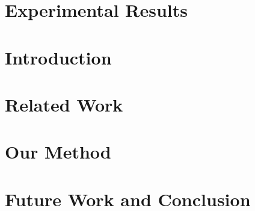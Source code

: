 \section{Experimental Results}
\label{sec:results}


\section{Introduction}
\label{sec:introduction}


\section{Related Work}
\label{sec:related}



\section{Our Method}
\label{sec:method}


\section{Future Work and Conclusion}
\label{sec:conclusion}

